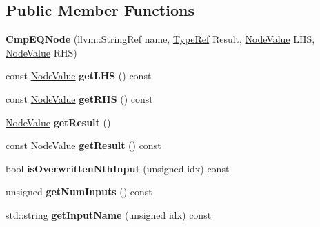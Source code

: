 \subsection*{Public Member Functions}
\begin{DoxyCompactItemize}
\item 
\mbox{\label{classglow_1_1_cmp_e_q_node_a47248b8d81b0fe07cf44cb01095eddc4}} 
{\bfseries Cmp\+E\+Q\+Node} (llvm\+::\+String\+Ref name, \hyperlink{structglow_1_1_type}{Type\+Ref} Result, \hyperlink{structglow_1_1_node_value}{Node\+Value} L\+HS, \hyperlink{structglow_1_1_node_value}{Node\+Value} R\+HS)
\item 
\mbox{\label{classglow_1_1_cmp_e_q_node_a7f5104fbd01c23f8607770b86ccadcd0}} 
const \hyperlink{structglow_1_1_node_value}{Node\+Value} {\bfseries get\+L\+HS} () const
\item 
\mbox{\label{classglow_1_1_cmp_e_q_node_abc9c033b2387a598559dd4f63d19fd52}} 
const \hyperlink{structglow_1_1_node_value}{Node\+Value} {\bfseries get\+R\+HS} () const
\item 
\mbox{\label{classglow_1_1_cmp_e_q_node_a8704b0b08cee08fc9389d081b2c97b08}} 
\hyperlink{structglow_1_1_node_value}{Node\+Value} {\bfseries get\+Result} ()
\item 
\mbox{\label{classglow_1_1_cmp_e_q_node_a93b0cfc4c79adb758a7208bdacddcf75}} 
const \hyperlink{structglow_1_1_node_value}{Node\+Value} {\bfseries get\+Result} () const
\item 
\mbox{\label{classglow_1_1_cmp_e_q_node_a2ee334c016384fc4fb73707fc0d0a0a8}} 
bool {\bfseries is\+Overwritten\+Nth\+Input} (unsigned idx) const
\item 
\mbox{\label{classglow_1_1_cmp_e_q_node_a04af03cb2b38db7e882b3b8925acf452}} 
unsigned {\bfseries get\+Num\+Inputs} () const
\item 
\mbox{\label{classglow_1_1_cmp_e_q_node_aa58f8cff31c542c53fa5f610e8a742f1}} 
std\+::string {\bfseries get\+Input\+Name} (unsigned idx) const
\item 

\end{DoxyCompactItemize}
